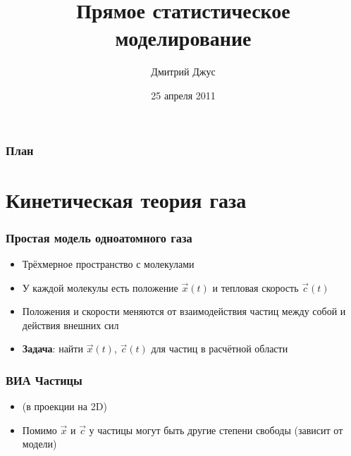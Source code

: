\documentclass[onlymath]{beamer}
\title{Прямое статистическое моделирование}
\author{Дмитрий Джус}
\institute{АК-121}
\date{25 апреля 2011}
\begin{document}
\begin{frame}
  \titlepage
\end{frame}

\begin{frame}
  \frametitle{План}
  \tableofcontents
\end{frame}

\section{Кинетическая теория газа}

\begin{frame}
  \frametitle{Простая модель одноатомного газа}
  \begin{itemize}
  \item Трёхмерное пространство с молекулами
  \item У каждой молекулы есть положение $\vec{x}(t)$ и тепловая
    скорость $\vec{c}(t)$
  \item Положения и скорости меняются от взаимодействия частиц между
    собой и действия внешних сил
  \item \textbf{Задача}: найти $\vec{x}(t)$, $\vec{c}(t)$ для частиц в
    расчётной области
  \end{itemize}
\end{frame}

\begin{frame}
  \frametitle{ВИА Частицы}
  \begin{figure}
    \centering
  \end{figure}
  \begin{itemize}
  \item (в проекции на 2D)
  \item Помимо $\vec{x}$ и $\vec{c}$ у частицы могут быть другие
    степени свободы (зависит от модели)
  \end{itemize}
\end{frame}
\end{document}
